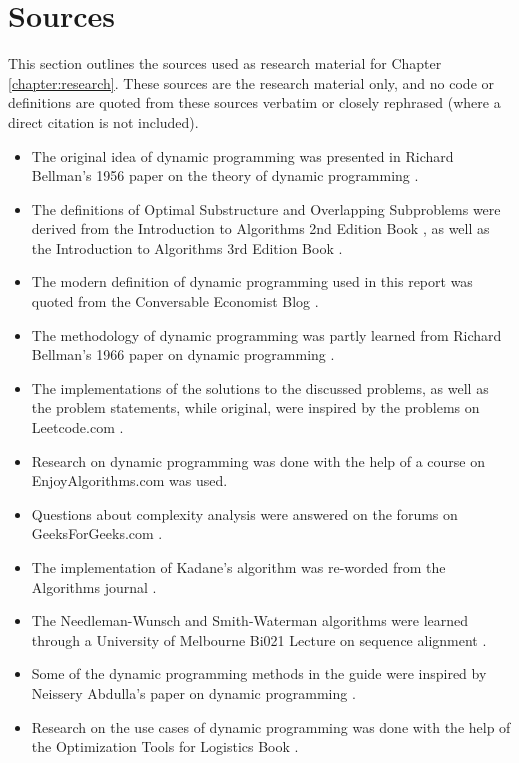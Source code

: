 \section{Sources}\label{sec:sources}
This section outlines the sources used as research material for Chapter \ref{chapter:research}.
These sources are the research material only, and no code or definitions are quoted from these sources verbatim or closely rephrased (where a direct citation is not included).
\begin{itemize}
    \item The original idea of dynamic programming was presented in Richard Bellman's 1956 paper on the theory of dynamic programming \cite{bellman1954theory}.
    \item The definitions of Optimal Substructure and Overlapping Subproblems were derived from the Introduction to Algorithms 2nd Edition Book \cite{algosbook1}, as well as the Introduction to Algorithms 3rd Edition Book \cite{algosbook2}.
    \item The modern definition of dynamic programming used in this report was quoted from the Conversable Economist Blog \cite{conversableeconomist}.
    \item The methodology of dynamic programming was partly learned from Richard Bellman's 1966 paper on dynamic programming \cite{bellman1966dynamic}.
    \item The implementations of the solutions to the discussed problems, as well as the problem statements, while original, were inspired by the problems on Leetcode.com \cite{leetcode}.
    \item Research on dynamic programming was done with the help of a course on EnjoyAlgorithms.com \cite{enjoyalgorithms} was used.
    \item Questions about complexity analysis were answered on the forums on GeeksForGeeks.com \cite{geeksforgeeks}.
    \item The implementation of Kadane's algorithm was re-worded from the Algorithms journal \cite{kadane2023two}.
    \item The Needleman-Wunsch and Smith-Waterman algorithms were learned through a University of Melbourne Bi021 Lecture on sequence alignment \cite{likic2008needleman}.
    \item Some of the dynamic programming methods in the guide were inspired by Neissery Abdulla's paper on dynamic programming \cite{abdulla2018dynamic}.
    \item Research on the use cases of dynamic programming was done with the help of the Optimization Tools for Logistics Book \cite{REVEILLAC201555}.
\end{itemize}


